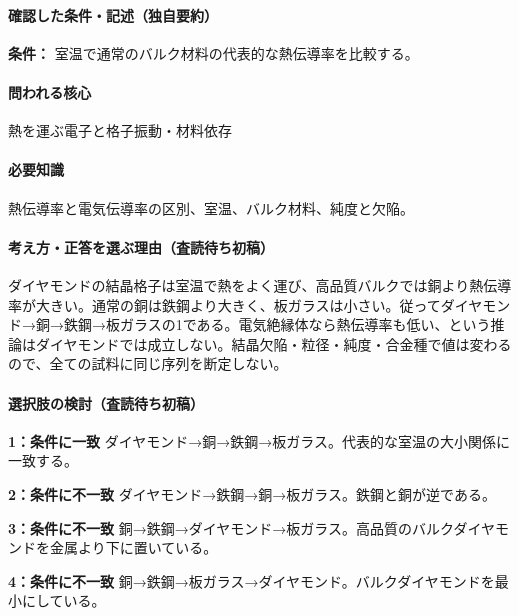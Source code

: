 \paragraph{確認した条件・記述（独自要約）}\mbox{}\par

\noindent\textbf{条件：} 室温で通常のバルク材料の代表的な熱伝導率を比較する。\par

\paragraph{問われる核心} 熱を運ぶ電子と格子振動・材料依存

\paragraph{必要知識} 熱伝導率と電気伝導率の区別、室温、バルク材料、純度と欠陥。

\paragraph{考え方・正答を選ぶ理由（査読待ち初稿）} ダイヤモンドの結晶格子は室温で熱をよく運び、高品質バルクでは銅より熱伝導率が大きい。通常の銅は鉄鋼より大きく、板ガラスは小さい。従ってダイヤモンド→銅→鉄鋼→板ガラスの1である。電気絶縁体なら熱伝導率も低い、という推論はダイヤモンドでは成立しない。結晶欠陥・粒径・純度・合金種で値は変わるので、全ての試料に同じ序列を断定しない。

\paragraph{選択肢の検討（査読待ち初稿）}\mbox{}\par

\noindent\textbf{1：条件に一致} ダイヤモンド→銅→鉄鋼→板ガラス。代表的な室温の大小関係に一致する。\par

\noindent\textbf{2：条件に不一致} ダイヤモンド→鉄鋼→銅→板ガラス。鉄鋼と銅が逆である。\par

\noindent\textbf{3：条件に不一致} 銅→鉄鋼→ダイヤモンド→板ガラス。高品質のバルクダイヤモンドを金属より下に置いている。\par

\noindent\textbf{4：条件に不一致} 銅→鉄鋼→板ガラス→ダイヤモンド。バルクダイヤモンドを最小にしている。\par


